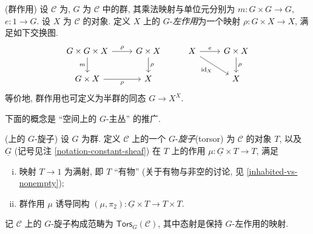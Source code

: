 \begin{definition}
	{(群作用)}
	设 $\mathcal C$ 为\topos{}, $G$ 为 $\mathcal C$ 中的群, 其乘法映射与单位元分别为 $m\colon G\times G\to G$, $e\colon 1\to G$. 设 $X$ 为 $\mathcal C$ 的对象. 定义 $X$ 上的 $G$-\emph{左作用}为一个映射 $\rho\colon G\times X\to X$, 满足如下交换图.
	\[\begin{tikzcd}[ampersand replacement=\&]
		{G\times G\times X} \& {G\times X} \& X \& {G\times X} \\
		{G\times X} \& X \&\& X
		\arrow["m"', from=1-1, to=2-1]
		\arrow["\rho", from=1-1, to=1-2]
		\arrow["\rho"', from=2-1, to=2-2]
		\arrow["\rho", from=1-2, to=2-2]
		\arrow["{\operatorname{id}_X}"', from=1-3, to=2-4]
		\arrow["e", from=1-3, to=1-4]
		\arrow["\rho", from=1-4, to=2-4]
	\end{tikzcd}\]
	等价地, 群作用也可定义为半群的同态 $G\to X^X$.
\end{definition}


下面的概念是 ``空间上的 $G$-主丛'' 的推广. %
\begin{definition}
	[label={G-torsors-over-topos}]
	{(\topos{}上的 $G$-旋子)}
	设 $G$ 为群. 定义 $\mathcal C$ 上的一个 $G$-\emph{旋子}\footnotemark (torsor) 为 $\mathcal C$ 的对象 $T$, 以及 $\underline G$ (记号见注 \ref{notation-constant-sheaf}) 在 $T$ 上的作用 $\mu\colon \underline G\times T \to T$, 满足
	\begin{enumerate}[(i)]
		\item 映射 $T\to 1$ 为满射, 即 $T$ ``有物'' (关于有物与非空的讨论, 见 \ref{inhabited-vs-nonempty});
		\item 群作用 $\mu$ 诱导同构 $(\mu,\pi_2)\colon \underline G\times T \to T\times T$.
	\end{enumerate}
	记 $\mathcal C$ 上的 $G$-旋子构成范畴为 $\mathsf{Tors}_G(\mathcal C)$, 其中态射是保持 $G$-左作用的映射.
\end{definition}

